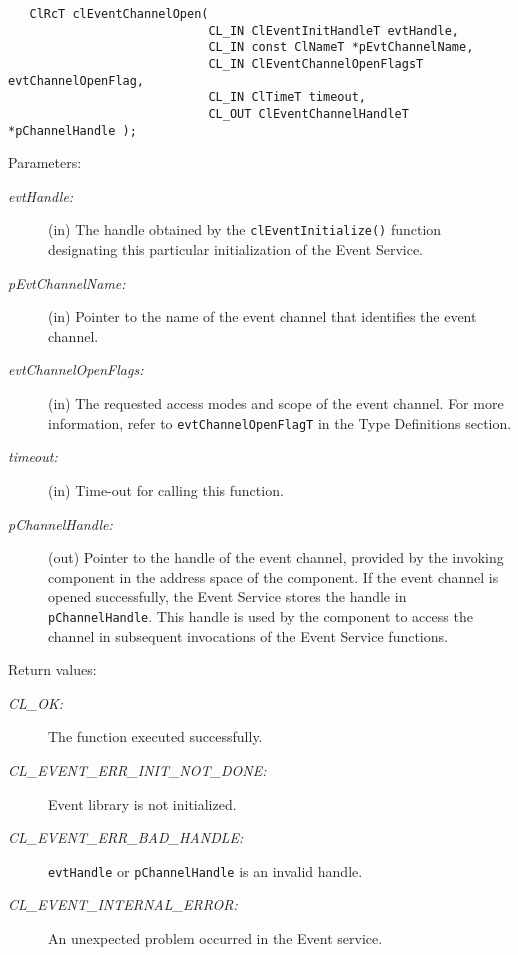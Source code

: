 \begin{flushleft}
\begin{Desc}
\footnotesize\begin{verbatim}   ClRcT clEventChannelOpen(
              				CL_IN ClEventInitHandleT evtHandle,
              				CL_IN const ClNameT *pEvtChannelName,
              				CL_IN ClEventChannelOpenFlagsT evtChannelOpenFlag,
              				CL_IN ClTimeT timeout,
              				CL_OUT ClEventChannelHandleT *pChannelHandle );
\end{verbatim}
\normalsize
\end{Desc}
\begin{Desc}
\item[Parameters:]
\begin{description}
\item[{\em evt\-Handle:}](in) The handle obtained by the {\tt{clEventInitialize()}} function designating this particular initialization of the Event 
Service.
\item[{\em p\-Evt\-Channel\-Name:}](in) Pointer to the name of the event channel that identifies the event channel.
\item[{\em evt\-Channel\-Open\-Flags:}](in) The requested access modes and scope of the event channel. For more information, refer to
{\tt{evtChannelOpenFlagT}} in the Type Definitions section.
\item[{\em timeout:}](in) Time-out for calling this function. 
 \item[{\em p\-Channel\-Handle:}](out) Pointer to the handle of the event channel, provided by the invoking component in the address space of the 
 component. If the  event channel is opened successfully, the Event Service stores the handle in {\tt{p\-Channel\-Handle}}. This handle is used by the 
 component to access the channel in subsequent invocations of the Event Service functions.\end{description}
\end{Desc}
\begin{Desc}
\item[Return values:]
\begin{description}
\item[{\em CL\_\-OK:}]The function executed successfully. 
\item[{\em CL\_\-EVENT\_\-ERR\_\-INIT\_\-NOT\_\-DONE:}]Event library is not initialized. 
\item[{\em CL\_\-EVENT\_\-ERR\_\-BAD\_\-HANDLE:}]{\tt{evtHandle}} or {\tt{pChannelHandle}} is an invalid handle. 
\item[{\em CL\_\-EVENT\_\-INTERNAL\_\-ERROR:}]An unexpected problem occurred in the Event service. 

\end{description}
\end{Desc}
\end{flushleft}
